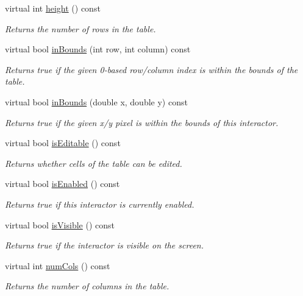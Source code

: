 \begin{DoxyCompactItemize}
virtual int \mbox{\hyperlink{classGTable_ad3774f6419003470f54fd495124ef51f}{height}} () const
\begin{DoxyCompactList}\small\item\em Returns the number of rows in the table. \end{DoxyCompactList}\item 
virtual bool \mbox{\hyperlink{classGTable_afa6b6241d2f7af75f2d1345f46acfc35}{in\+Bounds}} (int row, int column) const
\begin{DoxyCompactList}\small\item\em Returns true if the given 0-\/based row/column index is within the bounds of the table. \end{DoxyCompactList}\item 
virtual bool \mbox{\hyperlink{classGInteractor_afc480f652b8c5f1fb255e2269ce68879}{in\+Bounds}} (double x, double y) const
\begin{DoxyCompactList}\small\item\em Returns true if the given x/y pixel is within the bounds of this interactor. \end{DoxyCompactList}\item 
virtual bool \mbox{\hyperlink{classGTable_a012b5afb54e037e6c5498cf0932a521b}{is\+Editable}} () const
\begin{DoxyCompactList}\small\item\em Returns whether cells of the table can be edited. \end{DoxyCompactList}\item 
virtual bool \mbox{\hyperlink{classGInteractor_aacb819fb241851fd9fc045271baa4034}{is\+Enabled}} () const
\begin{DoxyCompactList}\small\item\em Returns true if this interactor is currently enabled. \end{DoxyCompactList}\item 
virtual bool \mbox{\hyperlink{classGInteractor_a9d8a6cfb13917785c143e74d40e4e2be}{is\+Visible}} () const
\begin{DoxyCompactList}\small\item\em Returns true if the interactor is visible on the screen. \end{DoxyCompactList}\item 
virtual int \mbox{\hyperlink{classGTable_a5997e103e56aae1db12e1f7f02e136c5}{num\+Cols}} () const
\begin{DoxyCompactList}\small\item\em Returns the number of columns in the table. \end{DoxyCompactList}\item 

\end{DoxyCompactItemize}
